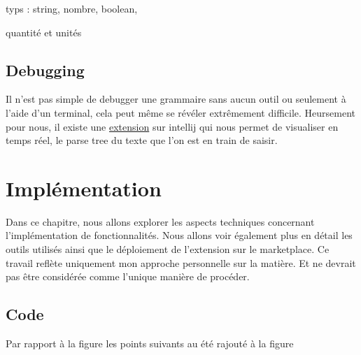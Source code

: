 \documentclass[
    iict, %
    il, %
]{heig-tb}
\begin{document}
typs : string, nombre, boolean,

quantité et unités


\section{Debugging}

Il n'est pas simple de debugger une grammaire sans aucun outil ou seulement à l'aide d'un terminal, cela peut même se révéler extrêmement difficile.
Heursement pour nous, il existe une \href{https://plugins.jetbrains.com/plugin/7358-antlr-v4}{extension} sur intellij qui nous permet de visualiser en temps réel, le parse tree du texte que l'on est en train de saisir.




\chapter{Implémentation}
Dans ce chapitre, nous allons explorer les aspects techniques concernant l'implémentation de fonctionnalités. Nous allons voir également plus en détail les outils utilisés ainsi que le déploiement de l'extension sur le marketplace.
Ce travail reflète uniquement mon approche personnelle sur la matière. Et ne devrait pas être considérée comme l'unique manière de procéder.




\section{Code}

Par rapport à la figure %
les points suivants au été rajouté à la figure %
\end{document}
